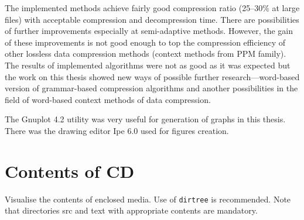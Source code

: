 \documentclass[thesis=M,english]{FITthesis}[2012/10/20]
\begin{document}
\begin{conclusion}
	The implemented methods achieve fairly good compression ratio (25--30$\%$ at large files) with acceptable compression and decompression time. There are possibilities of further improvements especially at semi-adaptive methods. However, the gain of these improvements is not good enough to top the compression efficiency of other lossless data compression methods (context methods from PPM family). The results of implemented algorithms were not as good as it was expected but the work on this thesis showed new ways of possible further research---word-based version of grammar-based compression algorithms and another possibilities in the field of word-based context methods of data compression.

	The Gnuplot 4.2 utility was very useful for generation of graphs in this thesis. There was the drawing editor Ipe 6.0 used for figures creation.
	\nocite{Po01}
\end{conclusion}




\appendix


\chapter{Contents of CD}\label{app:CDcontent}

Visualise the contents of enclosed media. Use of \verb|dirtree| is recommended. Note that directories src and text with appropriate contents are mandatory.


\begin{figure}
\end{figure}
\end{document}
